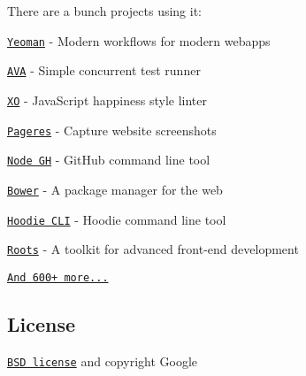 There are a bunch projects using it\+:


\begin{DoxyItemize}
\item \href{http://yeoman.io}{\tt Yeoman} -\/ Modern workflows for modern webapps
\item \href{https://ava.li}{\tt A\+VA} -\/ Simple concurrent test runner
\item \href{https://github.com/sindresorhus/xo}{\tt XO} -\/ Java\+Script happiness style linter
\item \href{https://github.com/sindresorhus/pageres}{\tt Pageres} -\/ Capture website screenshots
\item \href{http://nodegh.io}{\tt Node GH} -\/ Git\+Hub command line tool
\item \href{http://bower.io}{\tt Bower} -\/ A package manager for the web
\item \href{http://hood.ie}{\tt Hoodie C\+LI} -\/ Hoodie command line tool
\item \href{http://roots.cx}{\tt Roots} -\/ A toolkit for advanced front-\/end development
\end{DoxyItemize}

\href{https://www.npmjs.org/browse/depended/update-notifier}{\tt And 600+ more...}

\subsection*{License}

\href{http://opensource.org/licenses/bsd-license.php}{\tt B\+SD license} and copyright Google 